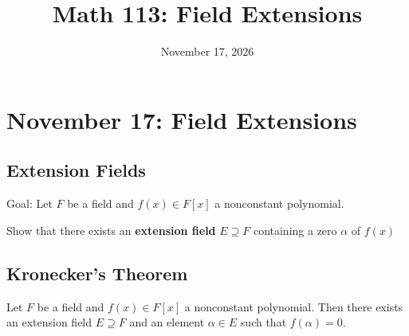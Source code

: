 \documentclass[main.tex]{subfiles}
\title{Math 113: Field Extensions}
\author{\defaultauthor}
\date{November 17, 2026}
\begin{document}
\ifSubfilesClassLoaded{\maketitle}{}

\section{November 17: Field Extensions}

\subsection{Extension Fields}
Goal: Let $F$ be a field and $f(x) \in F[x]$ a nonconstant polynomial.

Show that there exists an \textbf{extension field} $E \supseteq F$ containing a zero $\alpha$ of $f(x)$
\subsection{Kronecker's Theorem}

\begin{theorem}
Let $F$ be a field and $f(x)\in F[x]$ a nonconstant polynomial.
Then there exists an extension field $E\supseteq F$ and an element
$\alpha\in E$ such that $f(\alpha)=0$.
\end{theorem}
\end{document}

